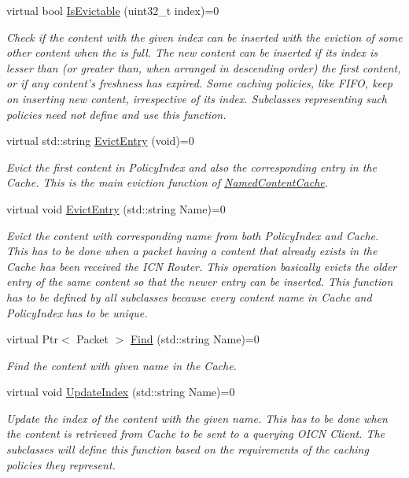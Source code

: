 \begin{DoxyCompactItemize}
virtual bool \hyperlink{classns3_1_1NamedContentCache_a281ad340f9771fa2ed898a1ad569d0da}{Is\-Evictable} (uint32\-\_\-t index)=0
\begin{DoxyCompactList}\small\item\em Check if the content with the given index can be inserted with the eviction of some other content when the is full. The new content can be inserted if its index is lesser than (or greater than, when arranged in descending order) the first content, or if any content's freshness has expired. Some caching policies, like F\-I\-F\-O, keep on inserting new content, irrespective of its index. Subclasses representing such policies need not define and use this function. \end{DoxyCompactList}\item 
virtual std\-::string \hyperlink{classns3_1_1NamedContentCache_a87850f01fc632ede64af75d7c20f7a7e}{Evict\-Entry} (void)=0
\begin{DoxyCompactList}\small\item\em Evict the first content in Policy\-Index and also the corresponding entry in the Cache. This is the main eviction function of \hyperlink{classns3_1_1NamedContentCache}{Named\-Content\-Cache}. \end{DoxyCompactList}\item 
virtual void \hyperlink{classns3_1_1NamedContentCache_a254f3c74475e104a615739fc7577296f}{Evict\-Entry} (std\-::string Name)=0
\begin{DoxyCompactList}\small\item\em Evict the content with corresponding name from both Policy\-Index and Cache. This has to be done when a packet having a content that already exists in the Cache has been received the I\-C\-N Router. This operation basically evicts the older entry of the same content so that the newer entry can be inserted. This function has to be defined by all subclasses because every content name in Cache and Policy\-Index has to be unique. \end{DoxyCompactList}\item 
virtual Ptr$<$ Packet $>$ \hyperlink{classns3_1_1NamedContentCache_a081439cd96d09e2f9f158f3aebe9fd7c}{Find} (std\-::string Name)=0
\begin{DoxyCompactList}\small\item\em Find the content with given name in the Cache. \end{DoxyCompactList}\item 
virtual void \hyperlink{classns3_1_1NamedContentCache_aeabf8afacd89cbc46b78b382c8a487e8}{Update\-Index} (std\-::string Name)=0
\begin{DoxyCompactList}\small\item\em Update the index of the content with the given name. This has to be done when the content is retrieved from Cache to be sent to a querying O\-I\-C\-N Client. The subclasses will define this function based on the requirements of the caching policies they represent. \end{DoxyCompactList}\end{DoxyCompactItemize}
